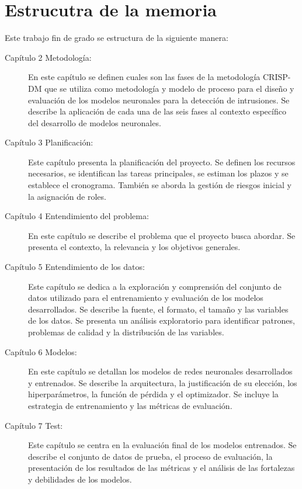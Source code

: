 \section{Estrucutra de la memoria} \label{sec.estr-memoria}

Este trabajo fin de grado se estructura de la siguiente manera:
\begin{description}
\item[Capítulo 2 Metodología:] En este capítulo se definen cuales son las fases de la metodología CRISP-DM que se utiliza como metodología y modelo de proceso para el diseño y evaluación de los modelos neuronales para la detección de intrusiones. Se describe la aplicación de cada una de las seis fases al contexto específico del desarrollo de modelos neuronales.

\item[Capítulo 3 Planificación:] Este capítulo presenta la planificación del proyecto. Se definen los recursos necesarios, se identifican las tareas principales, se estiman los plazos y se establece el cronograma. También se aborda la gestión de riesgos inicial y la asignación de roles.

\item[Capítulo 4 Entendimiento del problema:] En este capítulo se describe el problema que el proyecto busca abordar. Se presenta el contexto, la relevancia y los objetivos generales.

\item[Capítulo 5 Entendimiento de los datos:] Este capítulo se dedica a la exploración y comprensión del conjunto de datos utilizado para el entrenamiento y evaluación de los modelos desarrollados. Se describe la fuente, el formato, el tamaño y las variables de los datos. Se presenta un análisis exploratorio para identificar patrones, problemas de calidad y la distribución de las variables.

\item[Capítulo 6 Modelos:] En este capítulo se detallan los modelos de redes neuronales desarrollados y entrenados. Se describe la arquitectura, la justificación de su elección, los hiperparámetros, la función de pérdida y el optimizador. Se incluye la estrategia de entrenamiento y las métricas de evaluación.

\item[Capítulo 7 Test:] Este capítulo se centra en la evaluación final de los modelos entrenados. Se describe el conjunto de datos de prueba, el proceso de evaluación, la presentación de los resultados de las métricas y el análisis de las fortalezas y debilidades de los modelos.


\end{description}

